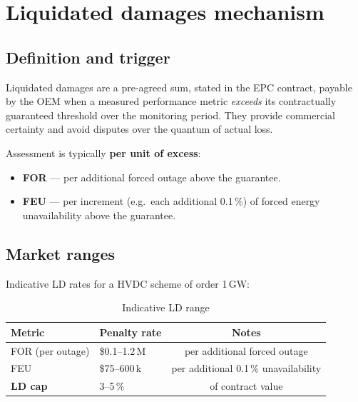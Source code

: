 \section{Liquidated damages mechanism}

\subsection{Definition and trigger}
Liquidated damages are a pre-agreed sum, stated in the EPC contract, payable
by the OEM when a measured performance metric \emph{exceeds} its contractually
guaranteed threshold over the monitoring period. They provide commercial
certainty and avoid disputes over the quantum of actual loss.

Assessment is typically \textbf{per unit of excess}:
\begin{itemize}\setlength{\itemsep}{0.2em}
  \item \textbf{FOR} --- per additional forced outage above the guarantee.
  \item \textbf{FEU} --- per increment (e.g.\ each additional 0.1\,\%) of forced
        energy unavailability above the guarantee.
\end{itemize}

\subsection{Market ranges}
Indicative LD rates for a HVDC scheme of order 1\,GW:

  

\begin{table}[htbp]
      \centering
      \begin{tabular}{@{}l l c@{}}
            \toprule
            \textbf{Metric} & \textbf{Penalty rate} & \textbf{Notes} \\
            \midrule
            FOR (per outage) & \$0.1--1.2\,M & per additional forced outage \\
            FEU              & \$75--600\,k  & per additional 0.1\,\% unavailability \\
            \textbf{LD cap}  & 3--5\,\%      & of contract value \\
            \bottomrule
      \end{tabular}
      \caption{Indicative LD range} \label{tab:ld-range}
\end{table}


